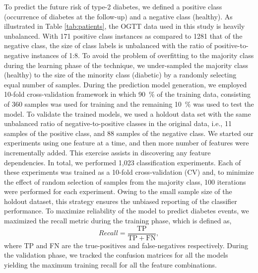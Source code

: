 \documentclass[journal,comsoc]{IEEEtran}
\begin{document}
To predict the future risk of type-2 diabetes, we defined a positive class (occurrence of diabetes at the follow-up) and a negative class (healthy). As illustrated in Table \ref{tab:patients}, the OGTT data used in this study is heavily unbalanced. With \num{171} positive class instances as compared to \num{1281} that of the negative class, the size of class labels is unbalanced with the ratio of positive-to-negative instances of 1:8. To avoid the problem of overfitting to the majority class during the learning phase of the technique, we under-sampled the majority class (healthy) to the size of the minority class (diabetic) by a randomly selecting equal number of samples. During the prediction model generation, we employed 10-fold cross-validation framework in which \SI{90}{\percent} of the training data, consisting of \num{360} samples was used for training and the remaining \SI{10}{\percent} was used to test the model. To validate the trained models, we used a holdout data set with the same unbalanced ratio of negative-to-positive classes in the original data, i.e., \num{11} samples of the positive class, and \num{88} samples of the negative class. We started our experiments using one feature at a time, and then more number of features were incrementally added. This exercise assists in discovering any feature dependencies. In total, we performed 1,023 classification experiments.  Each of these experiments was trained as a 10-fold cross-validation (CV) and, to minimize the effect of random selection of samples from the majority class, \num{100} iterations were performed for each experiment. Owing to the small sample size of the holdout dataset, this strategy ensures the unbiased reporting of the classifier performance. To maximize reliability of the model to predict diabetes events, we maximized the recall metric during the training phase, which is defined as,
%
\begin{equation}
    Recall = \frac{\mathrm{TP}}{\mathrm{TP} + \mathrm{FN}},
\end{equation}
%
where TP and FN are the true-positives and false-negatives respectively. During the validation phase, we tracked the confusion matrices for all the models yielding the maximum training recall for all the feature combinations.
\end{document}

